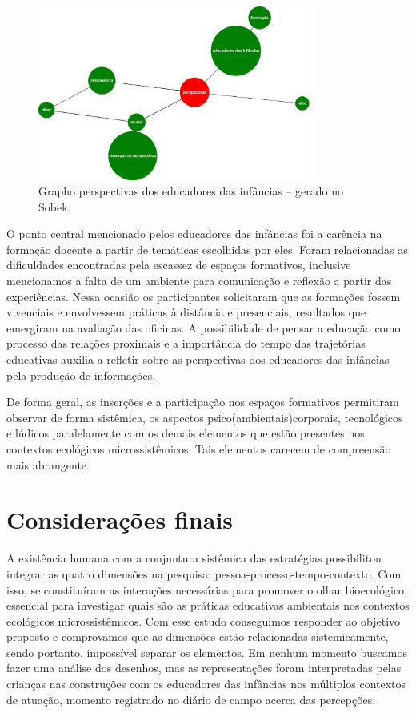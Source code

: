 \documentclass{textolivre}
\begin{document}
\begin{figure}[h!]
 \centering
 \includegraphics[width=0.8\textwidth]{figure09.pdf}
 \caption{Grapho perspectivas dos educadores das infâncias -- gerado no Sobek.}
 \label{fig-fig09}
\end{figure}

O ponto central mencionado pelos educadores das infâncias foi a carência na formação docente a partir de temáticas escolhidas por eles. Foram relacionadas as dificuldades encontradas pela escassez de espaços formativos, inclusive mencionamos a falta de um ambiente para comunicação e reflexão a partir das experiências. Nessa ocasião os participantes solicitaram que as formações fossem vivenciais e envolvessem práticas à distância e presenciais, resultados que emergiram na avaliação das oficinas. A possibilidade de pensar a educação como processo das relações proximais e a importância do tempo das trajetórias educativas auxilia a refletir sobre as perspectivas dos educadores das infâncias pela produção de informações.

De forma geral, as inserções e a participação nos espaços formativos permitiram observar de forma sistêmica, os aspectos psico(ambientais)corporais, tecnológicos e lúdicos paralelamente com os demais elementos que estão presentes nos contextos ecológicos microssistêmicos. Tais elementos carecem de compreensão mais abrangente.


\section{Considerações finais}\label{sec-consideracoes}
A existência humana com a conjuntura sistêmica das estratégias possibilitou integrar as quatro dimensões na pesquisa: pessoa-processo-tempo-contexto. Com isso, se constituíram as interações necessárias para promover o olhar bioecológico, essencial para investigar quais são as práticas educativas ambientais nos contextos ecológicos microssistêmicos. Com esse estudo conseguimos responder ao objetivo proposto e comprovamos que as dimensões estão relacionadas sistemicamente, sendo portanto, impossível separar os elementos. Em nenhum momento buscamos fazer uma análise dos desenhos, mas as representações foram interpretadas pelas crianças nas construções com os educadores das infâncias nos múltiplos contextos de atuação, momento registrado no diário de campo acerca das percepções.
\end{document}
